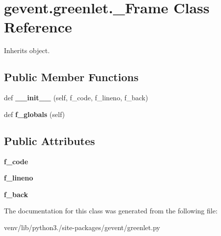 \hypertarget{classgevent_1_1greenlet_1_1___frame}{}\section{gevent.\+greenlet.\+\_\+\+Frame Class Reference}
\label{classgevent_1_1greenlet_1_1___frame}


Inherits object.

\subsection*{Public Member Functions}
\begin{DoxyCompactItemize}
\item 
\mbox{\label{classgevent_1_1greenlet_1_1___frame_a5723eff48c456e3478651eb671d372e5}} 
def {\bfseries \+\_\+\+\_\+init\+\_\+\+\_\+} (self, f\+\_\+code, f\+\_\+lineno, f\+\_\+back)
\item 
\mbox{\label{classgevent_1_1greenlet_1_1___frame_ae24fb6c36168a0e06b7f437e7190bd61}} 
def {\bfseries f\+\_\+globals} (self)
\end{DoxyCompactItemize}
\subsection*{Public Attributes}
\begin{DoxyCompactItemize}
\item 
\mbox{\label{classgevent_1_1greenlet_1_1___frame_ac324e5ee114cdf93850f5e88d0b765d0}} 
{\bfseries f\+\_\+code}
\item 
\mbox{\label{classgevent_1_1greenlet_1_1___frame_a7625d2392ee860174dc579fad3bb0724}} 
{\bfseries f\+\_\+lineno}
\item 
\mbox{\label{classgevent_1_1greenlet_1_1___frame_acf4a9c8d3e37763a9fd74d433aba27af}} 
{\bfseries f\+\_\+back}
\end{DoxyCompactItemize}


The documentation for this class was generated from the following file\+:\begin{DoxyCompactItemize}
\item 
venv/lib/python3./site-\/packages/gevent/greenlet.\+py\end{DoxyCompactItemize}
